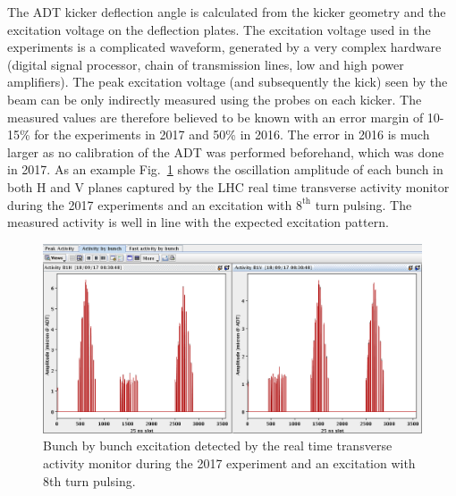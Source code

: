 \documentclass[%
 reprint,
 amsmath,amssymb,
 aps,
prstab,
]{revtex4-1}
\begin{document}
The ADT kicker deflection angle is calculated from the kicker geometry and the excitation voltage on the deflection plates. The excitation voltage used in the experiments is a complicated waveform, generated by a very complex hardware (digital signal processor, chain of transmission lines, low and high power amplifiers). The peak excitation voltage (and subsequently the kick) seen by the beam can be only indirectly measured using the probes on each kicker. The measured values are therefore believed to be known with an error margin of 10-15\% for the experiments in 2017 and 50\% in 2016. The error in 2016 is much larger as no calibration of the ADT was performed beforehand, which was done in 2017. As an example Fig.~\ref{fig:fill_meas} shows the oscillation amplitude of each bunch in both H and V planes captured by the LHC real time transverse activity monitor during the 2017 experiments and an excitation with $8^{\mathrm{th}}$ turn pulsing. The measured activity is well in line with the expected excitation pattern.
\begin{figure}[h]
	\centering
	\includegraphics[width=1.0\linewidth]{bunchfilling_measured.png}	
	\caption{\label{fig:fill_meas} Bunch by bunch excitation detected by the real time transverse activity monitor during the 2017 experiment and an excitation with 8th turn pulsing.}
\end{figure}
\end{document}

